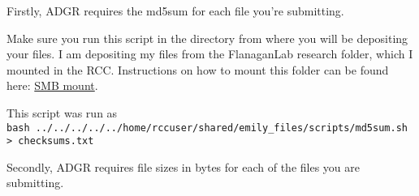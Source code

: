 \documentclass[
]{article}
\newenvironment{Shaded}{\begin{snugshade}}{\end{snugshade}}
\newcommand{\AttributeTok}[1]{\textcolor[rgb]{0.77,0.63,0.00}{#1}}
\newcommand{\BuiltInTok}[1]{#1}
\newcommand{\CommentTok}[1]{\textcolor[rgb]{0.56,0.35,0.01}{\textit{#1}}}
\newcommand{\ControlFlowTok}[1]{\textcolor[rgb]{0.13,0.29,0.53}{\textbf{#1}}}
\newcommand{\DecValTok}[1]{\textcolor[rgb]{0.00,0.00,0.81}{#1}}
\newcommand{\ExtensionTok}[1]{#1}
\newcommand{\FunctionTok}[1]{\textcolor[rgb]{0.00,0.00,0.00}{#1}}
\newcommand{\KeywordTok}[1]{\textcolor[rgb]{0.13,0.29,0.53}{\textbf{#1}}}
\newcommand{\NormalTok}[1]{#1}
\newcommand{\OperatorTok}[1]{\textcolor[rgb]{0.81,0.36,0.00}{\textbf{#1}}}
\newcommand{\OtherTok}[1]{\textcolor[rgb]{0.56,0.35,0.01}{#1}}
\newcommand{\PreprocessorTok}[1]{\textcolor[rgb]{0.56,0.35,0.01}{\textit{#1}}}
\newcommand{\StringTok}[1]{\textcolor[rgb]{0.31,0.60,0.02}{#1}}
\newcommand{\VariableTok}[1]{\textcolor[rgb]{0.00,0.00,0.00}{#1}}
\begin{document}
Firstly, ADGR requires the md5sum for each file you're submitting.

Make sure you run this script in the directory from where you will be
depositing your files. I am depositing my files from the FlanaganLab
research folder, which I mounted in the RCC. Instructions on how to
mount this folder can be found here:
\href{https://wiki.canterbury.ac.nz/display/RCC/Data+transfer}{SMB
mount}.

\begin{Shaded}
\end{Shaded}

This script was run as
\texttt{bash\ ../../../../../home/rccuser/shared/emily\_files/scripts/md5sum.sh\ \textgreater{}\ checksums.txt}

Secondly, ADGR requires file sizes in bytes for each of the files you
are submitting.

\begin{Shaded}
\end{Shaded}
\end{document}
